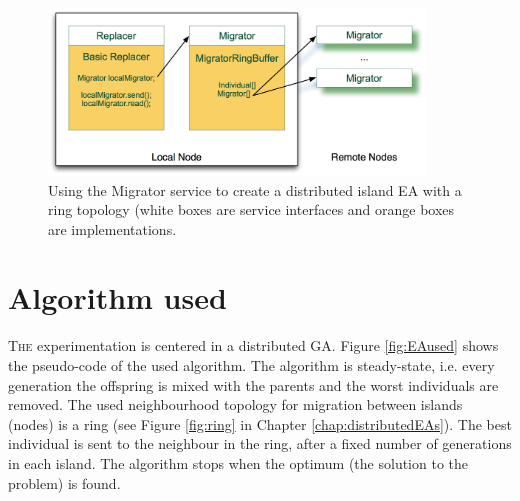 \begin{figure}
\centering
\includegraphics[width=10cm]{gfx/osgiliath/migrator.png}


\caption{Using the Migrator service to create a distributed island EA with a ring topology (white boxes are service interfaces and orange boxes are implementations.}
\label{MIGRATOR}
\end{figure}


\section{Algorithm used}
\lettrine{T}{he} experimentation is centered in a distributed GA. Figure \ref{fig:EAused} shows the pseudo-code of the used algorithm. 
The algorithm is steady-state, i.e. every generation the offspring is
mixed with the parents and the worst individuals are removed. %
 The used neighbourhood topology for migration between islands (nodes)
 is a ring (see Figure \ref{fig:ring} in Chapter
 \ref{chap:distributedEAs}). The best individual is sent to the
 neighbour in the ring, after a fixed number of generations in each
 island. The algorithm stops when the optimum (the solution to the
 problem) is found.   %

